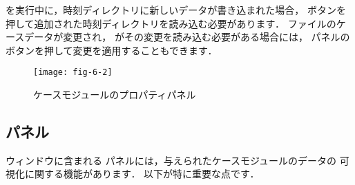 を実行中に，時刻ディレクトリに新しいデータが書き込まれた場合，
%
%
ボタンを押して追加された時刻ディレクトリを読み込む必要があります．
ファイルのケースデータが変更され，
がその変更を読み込む必要がある場合には，
パネルの
%
%
ボタンを押して変更を適用することもできます．


\begin{figure}[ht]
 \texttt{[image: fig-6-2]}
 \caption{ケースモジュールのプロパティパネル}
 \label{fig:6.2}
\end{figure}


\subsection{パネル}
\label{ssec:6.1.3}
ウィンドウに含まれる
%
%
パネルには，与えられたケースモジュールのデータの
可視化に関する機能があります．
以下が特に重要な点です．
